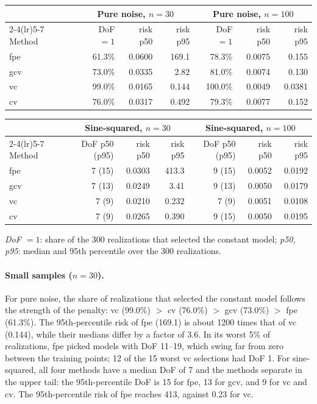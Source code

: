 \begin{center}\small
\begin{tabular}{l rrr rrr}
\toprule
 & \multicolumn{3}{c}{Pure noise, $n = 30$} & \multicolumn{3}{c}{Pure noise, $n = 100$} \\
\cmidrule(lr){2-4}\cmidrule(lr){5-7}
Method & DoF $= 1$ & risk p50 & risk p95 & DoF $= 1$ & risk p50 & risk p95 \\
\midrule
fpe & 61.3\% & 0.0600 & 169.1  & 78.3\%  & 0.0075 & 0.155 \\
gcv & 73.0\% & 0.0335 & 2.82   & 81.0\%  & 0.0074 & 0.130 \\
vc  & 99.0\% & 0.0165 & 0.144  & 100.0\% & 0.0049 & 0.0381 \\
cv  & 76.0\% & 0.0317 & 0.492  & 79.3\%  & 0.0077 & 0.152 \\
\bottomrule
\end{tabular}

\medskip
\begin{tabular}{l rrr rrr}
\toprule
 & \multicolumn{3}{c}{Sine-squared, $n = 30$} & \multicolumn{3}{c}{Sine-squared, $n = 100$} \\
\cmidrule(lr){2-4}\cmidrule(lr){5-7}
Method & DoF p50 (p95) & risk p50 & risk p95 & DoF p50 (p95) & risk p50 & risk p95 \\
\midrule
fpe & 7 (15) & 0.0303 & 413.3  & 9 (15) & 0.0052 & 0.0192 \\
gcv & 7 (13) & 0.0249 & 3.41   & 9 (13) & 0.0050 & 0.0179 \\
vc  & 7 (9)  & 0.0210 & 0.232  & 7 (9)  & 0.0051 & 0.0108 \\
cv  & 7 (9)  & 0.0265 & 0.390  & 9 (15) & 0.0050 & 0.0195 \\
\bottomrule
\end{tabular}

\smallskip
\emph{DoF $= 1$}: share of the 300 realizations that selected the constant model; \emph{p50}, \emph{p95}: median and
95th percentile over the 300 realizations.
\end{center}

\paragraph{Small samples ($n = 30$).}
For pure noise, the share of realizations that selected the constant model follows the strength of the penalty:
vc (99.0\%) $>$ cv (76.0\%) $>$ gcv (73.0\%) $>$ fpe (61.3\%). The 95th-percentile risk of fpe (169.1) is about 1200
times that of vc (0.144), while their medians differ by a factor of 3.6. In its worst 5\% of realizations, fpe picked
models with DoF 11--19, which swing far from zero between the training points; 12 of the 15 worst vc selections had
DoF 1. For sine-squared, all four methods have a median DoF of 7 and the methods separate in the upper tail: the
95th-percentile DoF is 15 for fpe, 13 for gcv, and 9 for vc and cv. The 95th-percentile risk of fpe reaches 413,
against 0.23 for vc.

